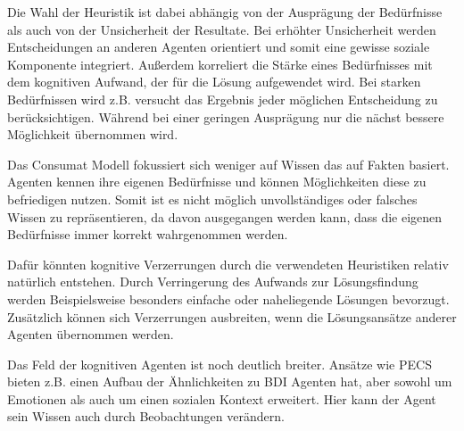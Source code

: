 Die Wahl der Heuristik ist dabei abhängig von der Ausprägung der Bedürfnisse als auch von der Unsicherheit der Resultate.
Bei erhöhter Unsicherheit werden Entscheidungen an anderen Agenten orientiert und somit eine gewisse soziale Komponente integriert.
Außerdem korreliert die Stärke eines Bedürfnisses mit dem kognitiven Aufwand, der für die Lösung aufgewendet wird.
Bei starken Bedürfnissen wird z.B. versucht das Ergebnis jeder möglichen Entscheidung zu berücksichtigen.
Während bei einer geringen Ausprägung nur die nächst bessere Möglichkeit übernommen wird.

Das Consumat Modell fokussiert sich weniger auf Wissen das auf Fakten basiert.
Agenten kennen ihre eigenen Bedürfnisse und können Möglichkeiten diese zu befriedigen nutzen\cite[Kapitel 4]{?}.%
Somit ist es nicht möglich unvollständiges oder falsches Wissen zu repräsentieren, da davon ausgegangen werden kann, dass die eigenen Bedürfnisse immer korrekt wahrgenommen werden.

Dafür könnten kognitive Verzerrungen durch die verwendeten Heuristiken relativ natürlich entstehen.
Durch Verringerung des Aufwands zur Lösungsfindung werden Beispielsweise besonders einfache oder naheliegende Lösungen bevorzugt.
Zusätzlich können sich Verzerrungen ausbreiten, wenn die Lösungsansätze anderer Agenten übernommen werden.

Das Feld der kognitiven Agenten ist noch deutlich breiter.
Ansätze wie PECS\cite{?} bieten z.B. einen Aufbau der Ähnlichkeiten zu BDI Agenten hat, aber sowohl um Emotionen als auch um einen sozialen Kontext erweitert.
Hier kann der Agent sein Wissen auch durch Beobachtungen verändern.

